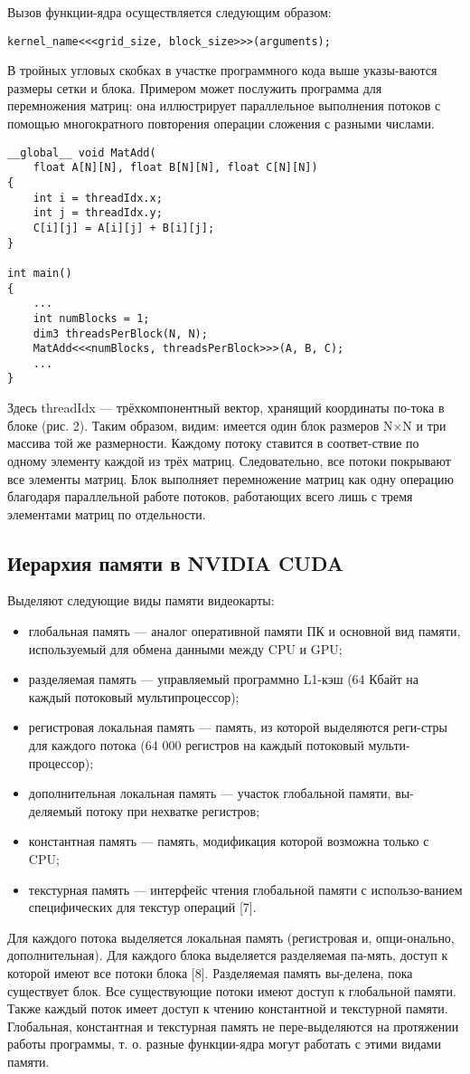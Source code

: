 Вызов функции-ядра осуществляется следующим образом:
\begin{verbatim}
kernel_name<<<grid_size, block_size>>>(arguments);
\end{verbatim}
В тройных угловых скобках в участке программного кода выше указы-ваются размеры сетки и блока.
Примером может послужить программа для перемножения матриц: она иллюстрирует параллельное выполнения потоков с помощью многократного повторения операции сложения с разными числами.
\begin{verbatim}
__global__ void MatAdd(
    float A[N][N], float B[N][N], float C[N][N])
{
    int i = threadIdx.x;
    int j = threadIdx.y;
    C[i][j] = A[i][j] + B[i][j];
}

int main()
{
    ...
    int numBlocks = 1;
    dim3 threadsPerBlock(N, N);
    MatAdd<<<numBlocks, threadsPerBlock>>>(A, B, C);
    ...
}

\end{verbatim}
Здесь threadIdx — трёхкомпонентный вектор, хранящий координаты по-тока в блоке (рис. 2). Таким образом, видим: имеется один блок размеров N×N и три массива той же размерности. Каждому потоку ставится в соответ-ствие по одному элементу каждой из трёх матриц. Следовательно, все потоки покрывают все элементы матриц. Блок выполняет перемножение матриц как одну операцию благодаря параллельной работе потоков, работающих всего лишь с тремя элементами матриц по отдельности.
\subsection{Иерархия памяти в NVIDIA CUDA}
Выделяют следующие виды памяти видеокарты:
\begin{itemize}
\item глобальная память — аналог оперативной памяти ПК и основной вид памяти, используемый для обмена данными между CPU и GPU;
\item разделяемая память — управляемый программно L1-кэш (64 Кбайт на каждый потоковый мультипроцессор);
\item регистровая локальная память — память, из которой выделяются реги-стры для каждого потока (64 000 регистров на каждый потоковый мульти-процессор);
\item дополнительная локальная память — участок глобальной памяти, вы-деляемый потоку при нехватке регистров;
\item константная память — память, модификация которой возможна только с CPU;
\item текстурная память — интерфейс чтения глобальной памяти с использо-ванием специфических для текстур операций [7].
\end{itemize}
Для каждого потока выделяется локальная память (регистровая и, опци-онально, дополнительная). Для каждого блока выделяется разделяемая па-мять, доступ к которой имеют все потоки блока [8]. Разделяемая память вы-делена, пока существует блок. Все существующие потоки имеют доступ к глобальной памяти. Также каждый поток имеет доступ к чтению константной и текстурной памяти. Глобальная, константная и текстурная память не пере-выделяются на протяжении работы программы, т. о. разные функции-ядра могут работать с этими видами памяти.

